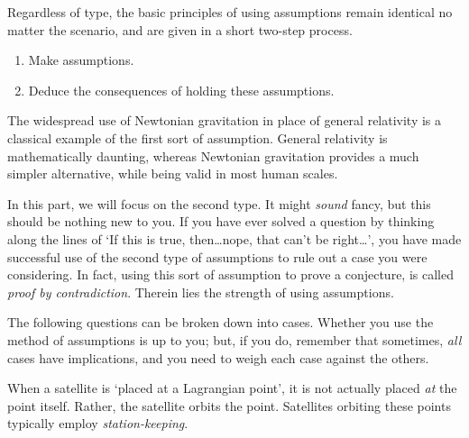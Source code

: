 \documentclass[a4paper,11pt]{exam}
\begin{document}
\begin{questions}
{	Regardless of type, the basic principles of using assumptions remain identical no matter the scenario, and are given in a short two-step process.
	\begin{enumerate}[leftmargin=12pt]
		\item Make assumptions.
		\item Deduce the consequences of holding these assumptions.
	\end{enumerate}

The widespread use of Newtonian gravitation in place of general relativity is a classical example of the first sort of assumption. General relativity is mathematically daunting, whereas Newtonian gravitation provides a much simpler alternative, while being valid in most human scales.

In this part, we will focus on the second type. It might \textit{sound} fancy, but this should be nothing new to you. If you have ever solved a question by thinking along the lines of `If this is true, then\dots nope, that can't be right\dots', you have made successful use of the second type of assumptions to rule out a case you were considering. In fact, using this sort of assumption to prove a conjecture, is called \textit{proof by contradiction}. Therein lies the strength of using assumptions. 

The following questions can be broken down into cases. Whether you use the method of assumptions is up to you; but, if you do, remember that sometimes, \textit{all} cases have implications, and you need to weigh each case against the others.
}

\vspace*{-10pt}
\question
	When a satellite is `placed at a Lagrangian point', it is not actually placed \textit{at} the point itself. Rather, the satellite orbits the point. Satellites orbiting these points typically employ \textit{station-keeping}.
\end{questions}
\end{document}
